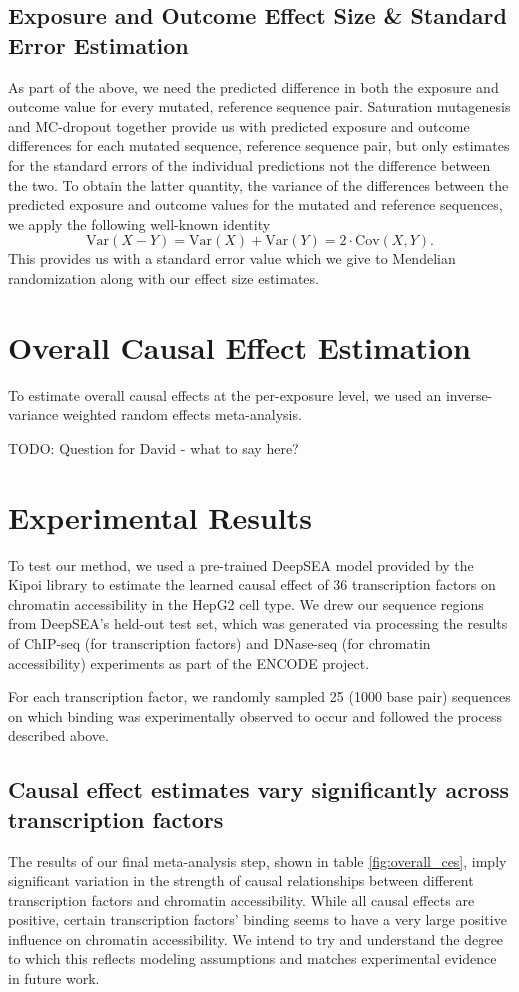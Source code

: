 \documentclass{article}
\begin{document}
\subsection{Exposure and Outcome Effect Size \& Standard Error Estimation}
As part of the above, we need the predicted difference in both the exposure and outcome value for every mutated, reference sequence pair. Saturation mutagenesis and MC-dropout together provide us with predicted exposure and outcome differences for each mutated sequence, reference sequence pair, but only estimates for the standard errors of the individual predictions not the difference between the two. To obtain the latter quantity, the variance of the differences between the predicted exposure and outcome values for the mutated and reference sequences, we apply the following well-known identity
\begin{equation}
    \text{Var}(X - Y) = \text{Var}(X) + \text{Var}(Y) = 2 \cdot \text{Cov}(X, Y).
\end{equation}
This provides us with a standard error value which we give to Mendelian randomization along with our effect size estimates.

\section{Overall Causal Effect Estimation}
To estimate overall causal effects at the per-exposure level, we used an inverse-variance weighted random effects meta-analysis.

TODO: Question for David - what to say here?


\section{Experimental Results}
To test our method, we used a pre-trained DeepSEA model provided by the Kipoi library  to estimate the learned causal effect of 36 transcription factors on chromatin accessibility in the HepG2 cell type. We drew our sequence regions from DeepSEA's held-out test set, which was generated via processing the results of ChIP-seq (for transcription factors) and DNase-seq (for chromatin accessibility) experiments as part of the ENCODE project.

For each transcription factor, we randomly sampled 25 (1000 base pair) sequences on which binding was experimentally observed to occur and followed the process described above. 

\subsection*{Causal effect estimates vary significantly across transcription factors}
The results of our final meta-analysis step, shown in table \ref{fig:overall_ces}, imply significant variation in the strength of causal relationships between different transcription factors and chromatin accessibility. While all causal effects are positive, certain transcription factors' binding seems to have a very large positive influence on chromatin accessibility. We intend to try and understand the degree to which this reflects modeling assumptions and matches experimental evidence in future work.
\end{document}
